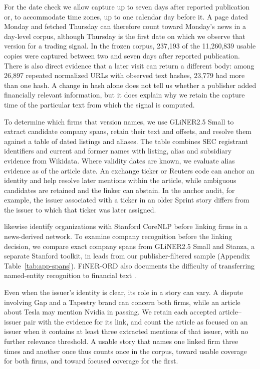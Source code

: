 For the date check we allow capture up to seven days after reported
publication or, to accommodate time zones, up to one calendar day before
it. A page dated Monday and fetched Thursday can therefore count toward
Monday's news in a day-level corpus, although Thursday is the first
date on which we observe that version for a trading signal. In the
frozen corpus, 237,193 of the 11,260,839 usable copies were captured
between two and seven days after reported publication. There is also
direct evidence that a later visit can return a different body:
among 26,897 repeated normalized URLs with observed text hashes,
23,779 had more than one hash. A change in hash alone does not tell
us whether a publisher added financially relevant information, but
it does explain why we retain the capture time of the particular text
from which the signal is computed.

To determine which firms that version names, we use GLiNER2.5 Small
\citep{gliner25} to extract candidate company spans, retain their text
and offsets, and resolve them against a table of dated listings and
aliases. The table combines SEC registrant identifiers and current and
former names with listing, alias and subsidiary evidence from Wikidata.
Where validity dates are known, we evaluate alias evidence as of the
article date. An exchange ticker or Reuters code can anchor an identity
and help resolve later mentions within the article, while ambiguous
candidates are retained and the linker can abstain. In the anchor
audit, for example, the issuer associated with a ticker
in an older Sprint story differs from the issuer to which that ticker
was later assigned.

\citet{schwenkler2020} likewise identify organizations with Stanford
CoreNLP before linking firms in a news-derived network. To examine
company recognition before the linking decision, we compare exact
company spans from GLiNER2.5 Small and Stanza, a separate Stanford
toolkit, in leads from our publisher-filtered sample (Appendix
Table~\ref{tab:app-spans}). FiNER-ORD also documents the difficulty of
transferring named-entity recognition to financial text \citep{shah2024}.

Even when the issuer's identity is clear, its role in a story can vary.
A dispute involving Gap and a Tapestry brand can concern both firms,
while an article about Tesla may mention Nvidia in passing. We retain
each accepted article--issuer pair with the evidence for its link,
and count the article as focused on an issuer when it contains at least
three extracted mentions of that issuer, with no further relevance
threshold. A usable story that names one linked firm three times and
another once thus counts once in the corpus, toward usable coverage for
both firms, and toward focused coverage for the first.

